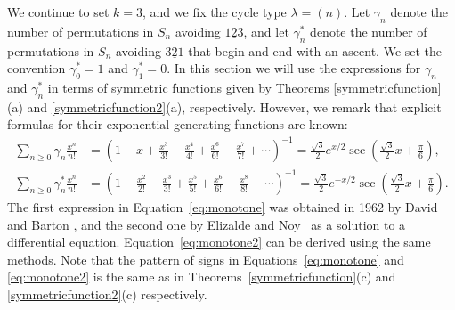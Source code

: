 \documentclass[12pt]{article}
\newcommand{\Perm}{S}
\newcommand{\gam}{\gamma}
\theoremstyle{definition}
\begin{document}
We continue to set $k = 3$, and we fix the cycle type $\lambda = (n)$.
Let $\gam_n$ denote the number of permutations in $\Perm_n$ avoiding $\underline{123}$, and let $\gam_n^*$ denote the number of permutations in $\Perm_n$ avoiding $\underline{321}$ that begin and end with an ascent. We set the convention $\gam_0^* = 1$ and $\gam_1^* = 0$. In this section we will use the expressions for $\gam_n$ and $\gam_n^*$ in terms of symmetric functions given by Theorems \ref{symmetricfunction}(a) and \ref{symmetricfunction2}(a), respectively. 
However, we remark that explicit formulas for their exponential generating functions are known:
\begin{align} \label{eq:monotone} \sum_{n\ge0} \gam_n \frac{x^n}{n!}&= \left( 1 - x + \frac{x^3}{3!} - \frac{x^{4}}{4!} + \frac{x^{6}}{6!} - \frac{x^{7}}{7!} + \cdots\right)^{-1} = \frac{\sqrt{3}}{2} e^{x/2} \sec\left(\frac{\sqrt{3}}{2} x + \frac{\pi}{6}\right), \\
 \label{eq:monotone2} \sum_{n\ge0} \gam_n^* \frac{x^n}{n!}&= \left( 1 - \frac{x^2}{2!} - \frac{x^3}{3!} + \frac{x^5}{5!} + \frac{x^6}{6!} - \frac{x^8}{8!} - \cdots\right)^{-1} =  \frac{\sqrt{3}}{2} e^{-x/2} \sec\left(\frac{\sqrt{3}}{2} x + \frac{\pi}{6}\right).
\end{align}
The first expression in Equation~\eqref{eq:monotone} was obtained in 1962 by David and Barton \cite[p.\ 156--157]{DB}, and the second one by Elizalde and Noy~\cite{EliNoy} as a solution to a differential equation. Equation~\eqref{eq:monotone2} can be derived using the same methods. Note that the pattern of signs in Equations~\eqref{eq:monotone} and \eqref{eq:monotone2} is the same as in Theorems~\ref{symmetricfunction}(c) and \ref{symmetricfunction2}(c) respectively.

\end{document}
